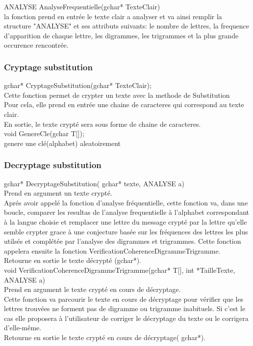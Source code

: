 \documentclass[a4]{article}
\begin{document}
		
		
	ANALYSE AnalyseFrequentielle(gchar* TexteClair)\\
		la fonction prend en entrée le texte clair a analyser et va ainsi remplir la structure "ANALYSE" et 
		ses attributs suivants:
		le nombre de lettres, la frequence d'apparition de chaque lettre, les digrammes, les trigrammes
		et la plus grande occurence rencontrée.\\
		
	\subsubsection{Cryptage substitution}
	gchar* CryptageSubstitution(gchar* TexteClair);\\
		Cette fonction permet de crypter un texte avec la methode de Substitution\\
		Pour cela, elle prend en entrée une chaine de caracteres qui correspond au texte clair.\\
		En sortie, le texte crypté sera sous forme de chaine de caracteres.\\
		
	void GenereCle(gchar T[]);\\
		genere une clé(alphabet) aleatoirement
	
	\subsubsection{Decryptage substitution}
	gchar* DecryptageSubstitution( gchar* texte, ANALYSE a)\\
		Prend en argument un texte crypté.\\
		Aprés avoir appelé la fonction d'analyse fréquentielle, cette fonction va, 
		dans une boucle, comparer les resultas de l'analyse frequentielle à l'alphabet
		 correspondant à la langue choisie et remplacer une lettre du message crypté 
		 par la lettre qu'elle semble crypter grace à une conjecture basée sur les 
		 fréquences des lettres les plus utilsés et complétée par l'analyse des digrammes 
		 et trigrammes. Cette fonction appelera ensuite la fonction VerificationCoherenceDigrammeTrigramme.\\
		Retourne en sortie le texte décrypté (gchar*).\\


	void VerificationCoherenceDigrammeTrigramme(gchar* T[], int *TailleTexte, ANALYSE a)\\
		Prend en argument le texte crypté en cours de décryptage.\\
		Cette fonction va parcourir le texte en cours de décryptage pour vérifier que les lettres trouvées 
		ne forment pas de digramme ou trigramme inabituels. Si c'est le cas elle proposera à l'utilisateur 
		de corriger le décryptage du texte ou le corrigera d'elle-même.\\
		Retourne en sortie le texte crypté en cours de décryptage( gchar*).\\
	
\end{document}
